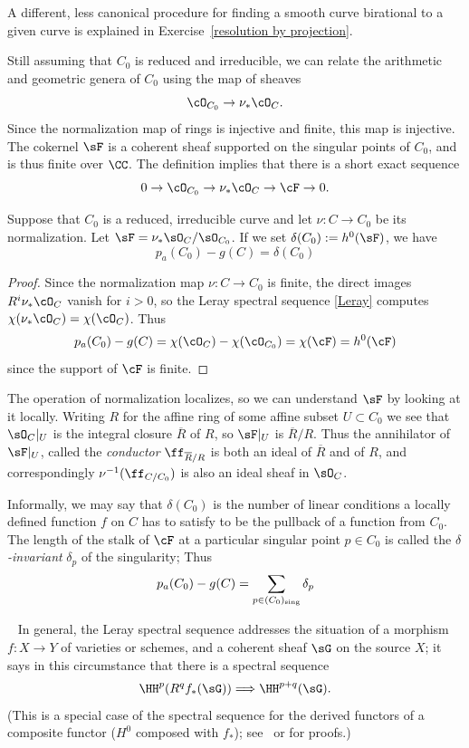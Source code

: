 A different, less canonical procedure for finding a smooth curve birational to a given curve
is explained in Exercise~\ref{resolution by projection}.

Still assuming that $C_0$ is reduced and irreducible, we can relate the arithmetic and geometric genera of $C_0$ using the map of sheaves
$$
\cO_{C_0} \to \nu_*\cO_C.
$$
Since the normalization map of rings  is injective and finite, this map is injective. The cokernel $\sF$ is a coherent sheaf supported on the singular points of $C_0$, and is thus finite over $\CC$. 
The definition implies that there is a short exact sequence
$$
0 \to \cO_{C_0} \to \nu_*\cO_C \to \cF \to 0.
$$

\begin{proposition}\label{pa and delta}
Suppose that $C_{0}$ is a reduced, irreducible curve and let  $\nu: C\to C_{0}$ be its normalization.
Let $\sF = \nu_{*}\sO_{C}/\sO_{C_{0}}$. If we set $\delta(C_{0}) := h^{0}(\sF)$, we have
 $$
p_a(C_0) - g(C) =  \delta(C_{0})
$$ 
\end{proposition}

\begin{proof}
 Since the normalization map $\nu: C \to C_0$ is finite,  the direct images $R^i\nu_*\cO_C$ vanish for $i > 0$, 
so the Leray spectral sequence \ref{Leray} computes $\chi(\nu_*\cO_C) = \chi(\cO_C)$. Thus
$$
p_a(C_0) - g(C) =  \chi(\cO_{C}) -   \chi(\cO_{C_0}) = \chi(\cF) = h^0(\cF) 
$$ 
since the support of $\cF$ is finite.
\end{proof}

\def\barR{{\overline R}}
The operation of normalization localizes, so we can understand $\sF$ by looking at it locally.
Writing $R$ for the affine ring of some affine subset $U\subset C_{0}$ we see that $\sO_{C}|_{U}$
is the integral closure $\barR$ of $R$, so $\sF|_{U}$ is $\overline R/R$. Thus
the annihilator of $\sF|_{U}$, called the \emph{conductor} $\ff_{\overline R/R}$ is
both an ideal of $\barR$ and of $R$, and correspondingly $\nu^{-1}(\ff_{C/C_{0}})$ 
is also an ideal sheaf in $\sO_{C}$.

Informally, we may say that $\delta(C_{0})$ is the number of linear conditions a locally defined function $f$ on $C$ has to satisfy to be the pullback of a function from $C_0$. The length of the stalk of $\cF$ at a particular singular point $p \in C_0$ is called the \emph{$\delta$-invariant} $\delta_p$ of the singularity; Thus
$$
p_a(C_0) - g(C) = \sum_{p \in (C_0)_{\rm sing}} \delta_p
$$ 

\begin{fact}~\label{Leray}
 In general, the Leray spectral sequence addresses the situation of  a morphism $f:X\to Y$ of varieties or schemes, 
 and a coherent sheaf $\sG$  on the source $X$; it says in this circumstance that there is a spectral sequence
  $$
  \HH^p(R^qf_*(\sG)) \Longrightarrow \HH^{p+q}(\sG).
  $$
(This is a special case of the spectral sequence for the derived functors of a composite functor ($H^0$ composed with $f_*$);
see~\cite[II.4.17.1]{Godement} or \cite[Section III.7]{Gelfand-Manin} for proofs.)
\end{fact}

